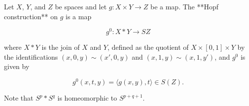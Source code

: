 Let $X$, $Y$, and $Z$ be spaces and let $g: X \times Y \rightarrow Z$ be a map. The **Hopf construction** on $g$ is a map

$$g^0: X \ast Y \rightarrow SZ$$

where $X \ast Y$ is the join of $X$ and $Y$, defined as the quotient of $X \times [0,1] \times Y$ by the identifications $(x,0,y) \sim (x',0,y)$ and $(x,1,y) \sim (x,1,y')$, and $g^0$ is given by

$$g^0(x,t,y) = \langle g(x,y), t \rangle \in S(Z).$$

Note that $S^p \ast S^q$ is homeomorphic to $S^{p+q+1}$.
